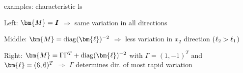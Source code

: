 \documentclass[11pt,compress,t,notes=noshow, xcolor=table]{beamer}
\begin{document}
\begin{framei}{examples: characteristic ls}



\item Left: $\bm{M} = \id$ $\Rightarrow$ same variation in all directions
\item Middle: $\bm{M} = \diag(\bm{\ls})^{-2}$ $\Rightarrow$ less variation in $x_2$ direction ($\ell_2 > \ell_1$)
\item Right: $\bm{M} = \Gamma \Gamma^T + \diag(\bm{\ls})^{-2}$ with $\Gamma = (1, -1)^T$ and $\bm{\ls} = (6, 6)^T$ $\Rightarrow$ $\Gamma$ determines dir. of most rapid variation
\vfill
{}

\end{framei}

\endlecture
\end{document}

